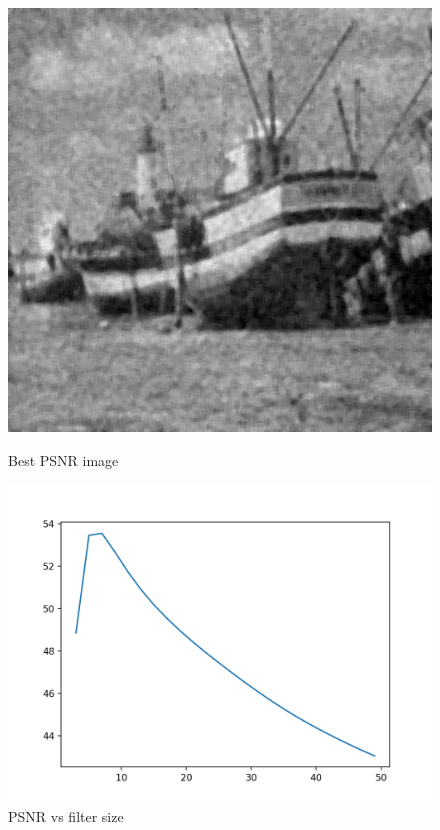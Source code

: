 \documentclass{article}
\begin{document}
    \begin{figure}[!htb]
      \includegraphics[scale=0.3]{./basic_denoising/boat/median_best_gaussian.png}
      \caption{Best PSNR image}
    \endminipage \hfill
      \includegraphics[scale=.45]{./basic_denoising/boat/median_psnr_gaussian.png}
      \caption{PSNR vs filter size}
    \endminipage
    \end{figure}
    \pagebreak
\end{document}
